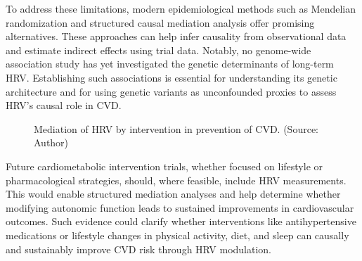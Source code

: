 \documentclass[
  a4paper,
  headsepline=true,
  open=any]{scrbook}
\begin{document}
To address these limitations, modern epidemiological methods such as
Mendelian randomization and structured causal mediation analysis offer
promising alternatives. These approaches can help infer causality from
observational data and estimate indirect effects using trial data.
Notably, no genome-wide association study has yet investigated the
genetic determinants of long-term HRV. Establishing such associations is
essential for understanding its genetic architecture and for using
genetic variants as unconfounded proxies to assess HRV's causal role in
CVD.

\begin{figure}

\begin{minipage}[t]{\linewidth}

{\centering 


\caption{Mediation of HRV by intervention in prevention of CVD. (Source:
Author)}

}

\end{minipage}%

\end{figure}

Future cardiometabolic intervention trials, whether focused on lifestyle
or pharmacological strategies, should, where feasible, include HRV
measurements. This would enable structured mediation analyses and help
determine whether modifying autonomic function leads to sustained
improvements in cardiovascular outcomes. Such evidence could clarify
whether interventions like antihypertensive medications or lifestyle
changes in physical activity, diet, and sleep can causally and
sustainably improve CVD risk through HRV modulation.
\end{document}
